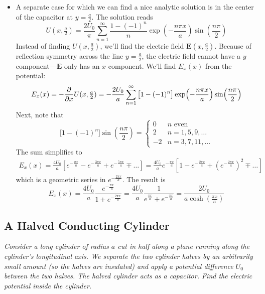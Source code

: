 \documentclass[11pt, a4paper]{article}
\renewcommand{\vec}[1]{\bm{#1}} %
\newcommand{\E}{\vec{E}}  %
\begin{document}
\begin{itemize}
	\item A separate case for which we can find a nice analytic solution is in the center of the capacitor at $ y = \frac{a}{2} $. The solution reads
	\begin{equation*}
		U(x, \tfrac{a}{2}) = \frac{2U_{0}}{\pi} \sum_{n = 1}^{\infty}\frac{1 - (-1)^{n}}{n}\exp(-\frac{n\pi x}{a}) \sin(\frac{n\pi}{2})
	\end{equation*}
	Instead of finding $ U(x, \tfrac{a}{2}) $, we'll find the electric field $ \E(x, \tfrac{a}{2}) $. Because of reflection symmetry across the line $ y = \frac{a}{2} $, the electric field cannot have a $ y $ component---$ \E $ only has an $ x $ component. We'll find $ E_{x}(x) $ from the potential:
	\begin{equation*}
		E_{x}(x) = -\pdv{}{x}U(x, \tfrac{a}{2}) = -\frac{2U_{0}}{a} \sum_{n = 1}^{\infty}\big[1 - (-1)^{n}\big]\exp(-\frac{n\pi x}{a}) \sin(\frac{n\pi}{2})
	\end{equation*}
	Next, note that
	\begin{equation*}
		\big[1 - (-1)^{n}\big]\sin(\frac{n\pi}{2}) = 
		\begin{cases}
			0 & n \text{ even}\\
			2 & n = 1, 5, 9, \ldots\\
			- 2 & n = 3, 7, 11, \ldots
		\end{cases}
	\end{equation*}
	The sum simplifies to
	\begin{align*}
		E_{x}(x) = \frac{4U_{0}}{a}\left[e^{-\frac{\pi x}{a}} - e^{-\frac{3\pi x}{a}} + e^{-\frac{5\pi x}{a}} \mp \ldots \right] = \frac{4U_{0}}{a}e^{-\frac{\pi x}{a}}\left[1 - e^{-\frac{2\pi x}{a}} + \left(e^{-\frac{2\pi x}{a}}\right)^{2}\mp \ldots \right]
	\end{align*}
	which is a geometric series in $ e^{-\frac{2\pi x}{a}} $. The result is
	\begin{equation*}
		E_{x}(x) =  \frac{4U_{0}}{a}\frac{e^{-\frac{\pi x}{a}}}{1 + e^{-\frac{2\pi x}{a}}} = \frac{4U_{0}}{a}\frac{1}{e^{\frac{\pi x}{a}} + e^{-\frac{\pi x}{a}}} = \frac{2U_{0}}{a\cosh(\frac{\pi x}{a})}
	\end{equation*}
\end{itemize}

\subsection{A Halved Conducting Cylinder}
\textit{Consider a long cylinder of radius $ a $ cut in half along a plane running along the cylinder's longitudinal axis. We separate the two cylinder halves by an arbitrarily small amount (so the halves are insulated) and apply a potential difference $ U_{0} $ between the two halves. The halved cylinder acts as a capacitor. Find the electric potential inside the cylinder.}
\end{document}
